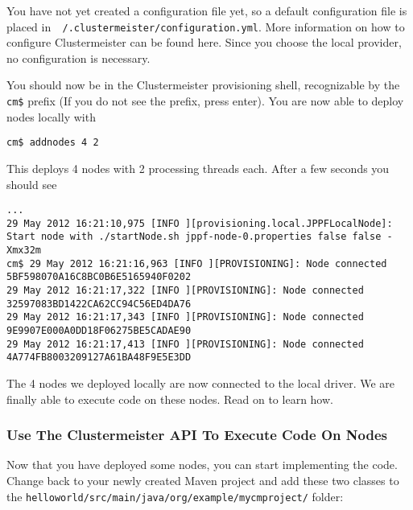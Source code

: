 \documentclass[english]{uzhpub}
\begin{document}
You have not yet created a configuration file yet, so a default configuration file is placed in\texttt{ ~/.clustermeister/configuration.yml}. More information on how to configure Clustermeister can be found here. Since you choose the local provider, no configuration is necessary.

You should now be in the Clustermeister provisioning shell, recognizable by the \texttt{cm\$} prefix (If you do not see the prefix, press enter). You are now able to deploy nodes locally with

\begin{lstlisting}[breaklines=true, backgroundcolor=\color{lbcolor}]
cm$ addnodes 4 2
\end{lstlisting}

This deploys 4 nodes with 2 processing threads each. After a few seconds you should see

\begin{lstlisting}[breaklines=true, backgroundcolor=\color{lbcolor}]
...
29 May 2012 16:21:10,975 [INFO ][provisioning.local.JPPFLocalNode]: Start node with ./startNode.sh jppf-node-0.properties false false -Xmx32m
cm$ 29 May 2012 16:21:16,963 [INFO ][PROVISIONING]: Node connected 5BF598070A16C8BC0B6E5165940F0202
29 May 2012 16:21:17,322 [INFO ][PROVISIONING]: Node connected 32597083BD1422CA62CC94C56ED4DA76
29 May 2012 16:21:17,343 [INFO ][PROVISIONING]: Node connected 9E9907E000A0DD18F06275BE5CADAE90
29 May 2012 16:21:17,413 [INFO ][PROVISIONING]: Node connected 4A774FB8003209127A61BA48F9E5E3DD
\end{lstlisting}

The 4 nodes we deployed locally are now connected to the local driver. We are finally able to execute code on these nodes. Read on to learn how.

\subsubsection{Use The Clustermeister API To Execute Code On Nodes}

Now that you have deployed some nodes, you can start implementing the code. Change back to your newly created Maven project and add these two classes to the \texttt{helloworld/src/main/java/org/example/mycmproject/} folder:




\end{document}
